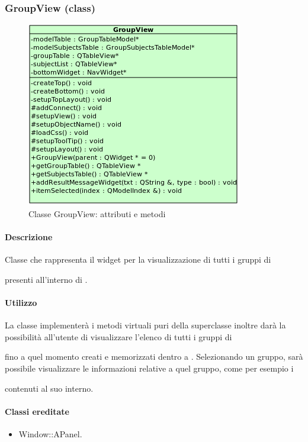 \subsubsection{GroupView (class)}
\label{spegroV}
\begin{figure}[!h]
\centering
			\includegraphics[width=0.5\linewidth]{./Content/Immagini/view/GroupView.png}
			\caption{Classe GroupView: attributi e metodi}
			\label{cl_groview}
\end{figure}
\paragraph{Descrizione \\}
Classe che rappresenta il widget per la visualizzazione di tutti i gruppi di \subject{} presenti all'interno di \project.
\paragraph{Utilizzo\\}
La classe implementerà i metodi virtuali puri della superclasse inoltre darà la possibilità all'utente di visualizzare l'elenco di tutti i gruppi di \subject{} fino a quel momento creati e memorizzati dentro a \project. Selezionando un gruppo, sarà possibile visualizzare le informazioni relative a quel gruppo, come per esempio i \subject{} contenuti al suo interno.
\paragraph{Classi ereditate\\}
\begin{itemize}
\item Window::APanel.
\end{itemize}
